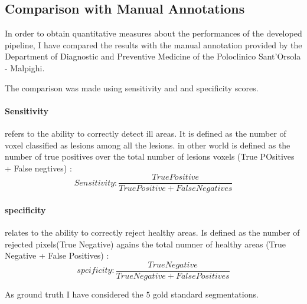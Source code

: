 \documentclass{standalone}
\begin{document}
	\subsection{Comparison with Manual Annotations}
	
	In order to obtain quantitative measures about the performances of the developed pipeline, I have compared the results with the manual annotation provided by the Department of Diagnostic and Preventive Medicine of the Poloclinico Sant'Orsola - Malpighi. 
	
	The comparison was made using sensitivity and and specificity scores. 
	\paragraph{Sensitivity} refers to the ability to correctly detect ill areas. It is defined as the number of voxel classified as lesions among all the lesions. in other world is defined as the number of true positives over the total number of lesions voxels (True POsitives + False negtives) : 
	\begin{equation}\label{eq:sensitivity}
		Sensitivity : \frac{True Positive}{True Positive + False Negatives}
	\end{equation}

	\paragraph{specificity} relates to the  ability to correctly reject healthy areas. Is defined as the number of rejected pixels(True Negative) agains the total numner of healthy areas (True Negative + False Positives) : 
	\begin{equation}
		spcificity : \frac{True Negative}{True Negative + False Positives}
	\end{equation}
	
	As ground truth I have considered the $5$ gold standard segmentations.
	
\end{document}
